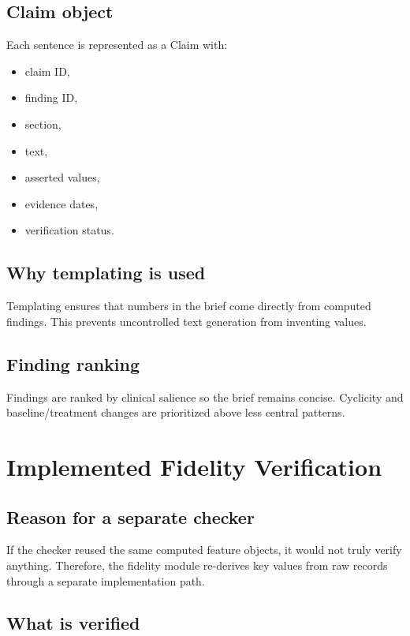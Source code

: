 \documentclass[11pt,a4paper]{article}
\begin{document}
\subsection{Claim object}

Each sentence is represented as a Claim with:

\begin{itemize}
  \item claim ID,
  \item finding ID,
  \item section,
  \item text,
  \item asserted values,
  \item evidence dates,
  \item verification status.
\end{itemize}

\subsection{Why templating is used}

Templating ensures that numbers in the brief come directly from computed findings. This prevents uncontrolled text generation from inventing values.

\subsection{Finding ranking}

Findings are ranked by clinical salience so the brief remains concise. Cyclicity and baseline/treatment changes are prioritized above less central patterns.

\section{Implemented Fidelity Verification}

\subsection{Reason for a separate checker}

If the checker reused the same computed feature objects, it would not truly verify anything. Therefore, the fidelity module re-derives key values from raw records through a separate implementation path.

\subsection{What is verified}
\end{document}
